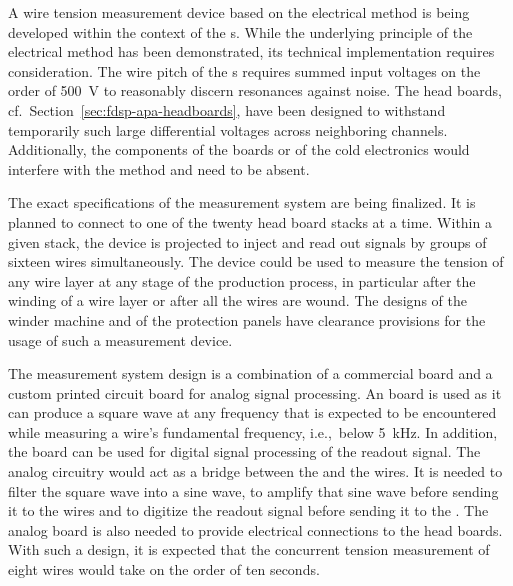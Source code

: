 A wire tension measurement device based on the electrical method is being developed within the context of the  s. While the underlying principle of the electrical method has been demonstrated, its technical implementation requires consideration. The wire pitch of the s requires summed input voltages on the order of \SI{500}{V} to reasonably discern resonances against noise. The head boards, cf.\ Section~\ref{sec:fdsp-apa-headboards}, have been designed to withstand temporarily such large differential voltages across neighboring channels. Additionally, the components of the  boards or of the cold electronics would interfere with the method and need to be absent.

The exact specifications of the measurement system are being finalized. It is planned to connect to one of the twenty head board stacks at a time. Within a given stack, the device is projected to inject and read out signals by groups of sixteen wires simultaneously. The device could be used to measure the tension of any wire layer at any stage of the production process, in particular after the winding of a wire layer or after all the wires are wound. The designs of the winder machine and of the  protection panels have clearance provisions for the usage of such a measurement device.

The measurement system design is a combination of a commercial  board and a custom printed circuit board for analog signal processing. An  board is used as it can produce a square wave at any frequency that is expected to be encountered while measuring a wire's fundamental frequency, i.e.,\ below \SI{5}{kHz}. In addition, the  board can be used for digital signal processing of the readout signal. The analog circuitry would act as a bridge between the  and the  wires. It is needed to filter the square wave into a sine wave, to amplify that sine wave before sending it to the wires and to digitize the readout signal before sending it to the . The analog board is also needed to provide electrical connections to the head boards. With such a design, it is expected that the concurrent tension measurement of eight wires would take on the order of ten seconds.

